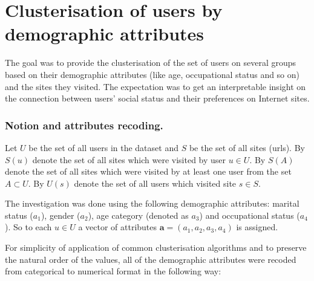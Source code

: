 \documentclass[runningheads,a4paper]{llncs}
\begin{document}
\section{Clusterisation of users by demographic attributes}

The goal was to provide the clusterisation of the set of users on several groups based on their demographic attributes (like age, occupational status and so on) and the sites they visited. The expectation was to get an interpretable insight on the connection between users' social status and their preferences on Internet sites. 





\subsubsection{Notion and attributes recoding.}

Let $U$ be the set of all users in the dataset and $S$ be the set of all sites (urls). By $S(u)$ denote the set of all sites which were visited by user $u \in U$. By $S(A)$ denote the set of all sites which were visited by at least one user from the set $A \subset U$. By $U(s)$ denote the set of all users which visited site $s \in S$.


The investigation was done using the following demographic attributes: marital status ($a_1$), gender ($a_2$), age category (denoted as $a_3$) and occupational status ($a_4$). So to each $u \in U$ a vector of attributes $\boldsymbol{a} = (a_1, a_2, a_3, a_4)$ is assigned.

For simplicity of application of common clusterisation algorithms and to preserve the natural order of the values, all of the demographic attributes were recoded from categorical to numerical format in the following way:
\end{document}
